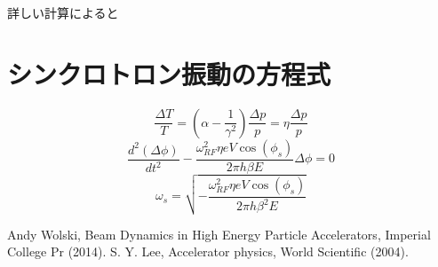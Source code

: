 \documentclass[10pt,a4paper]{ltjsarticle}
\begin{document}
詳しい計算によると

\section{シンクロトロン振動の方程式}
%
\begin{equation}
  \frac{\Delta T}{T}=\left(\alpha - \frac{1}{\gamma^2}\right)\frac{\Delta p}{p}=\eta\frac{\Delta p}{p}
  \label{eq20}
\end{equation}
%
\begin{equation}
  \frac{d^2(\Delta\phi)}{dt^2}-\frac{\omega_{RF}^2\eta e V\cos(\phi_s)}{2\pi h \beta E}\Delta\phi = 0
  \label{eq21}
\end{equation}
%
\begin{equation}
  \omega_s = \sqrt{-\frac{\omega_{RF}^2\eta e V \cos(\phi_s)}{2\pi h \beta^2 E}}
  \label{eq22}
\end{equation}
%
\begin{thebibliography}{99}
  Andy Wolski, Beam Dynamics in High Energy Particle Accelerators,  Imperial College Pr (2014).
  S. Y. Lee, Accelerator physics, World Scientific (2004).
\end{thebibliography}
%
\end{document}
